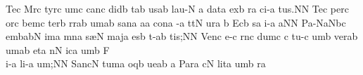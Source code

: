 \spatium
\sgn Te{}\punctum c\egn
\spatium
\sgn M{\a}r\punctum c\egn
\sgn tyr\punctum c\egn
\sgn {}um\punctum c\egn
\spatium\sgn can\punctum c\egn
\sgn did\punctum b\egn
\sgn {}{\a}t\pes ab\egn
\sgn {}us\punctum a\augmentum b\egn
\spatium
\divisiominor
\spatium
\sgn l{au}-\punctum N\egn
\custos a
\lineaproxima
\sgn dat\punctum a\egn
\spatium
\sgn {}ex\punctum b\egn
\sgn {}{\e}r\punctum a\egn
\sgn ci-\punctum a\egn
\sgn tu{s.}\punctum N\augmentum N\egn
\spatium\divisiofinalis\spatium
\sgn Te{}\punctum c\egn
\spatium\sgn per\punctum c\egn
\spatium\sgn {}or\punctum c\egn
\sgn bem\punctum c\egn
\spatium\sgn ter\punctum b\egn
\sgn r{\a}r\pes ab\egn
\sgn {}um\punctum a\augmentum b\egn
\spatium
\divisiominor
\spatium
\sgn san\punctum a\egn
{}a{}\punctum a\egn
\spatium
\sgn con\punctum a\egn
{}-\punctum a\egn
\sgn t{\e}t\punctum N\egn
\sgn {}ur\punctum a\egn
\spatium
\custos b
\lineaproxima
\sgn {}Ec\punctum b\egn
{}s\punctum a\egn
\sgn {}i-\punctum a\egn
\sgn {}a{}\punctum N\augmentum N\egn
\spatium
\divisiofinalis
\spatium
\sgn Pa{-}\pes Na\augmentum N\nonspatium\hskip-3pt\quilismapes bc\egn
{}em\clivis ba\augmentumduplex bN\egn
\spatium
\divisiominima
\spatium
\sgn {}im\punctum a\egn
\sgn m{\e}n\punctum a\egn
\sgn s{\ae}{}\punctum N\egn
\spatium
\sgn maj\punctum a\egn
\sgn {}es\punctum b\egn
\sgn t{\a}-\punctum a\augmentum b\egn
\sgn ti{s;}\punctum N\augmentum N\egn
\spatium
\divisiofinalis
\spatium
\sgn Ven\punctum c\egn
\sgn {}e-\punctum c\egn
\sgn r{\a}n\punctum c\egn
\sgn dum\punctum c\egn
\spatium
\custos c
\lineaproxima
\sgn tu-\punctum c\egn
\sgn {}um\punctum b\egn
\spatium
\sgn ver\pes ab\egn
\sgn {}um\punctum a\augmentum b\egn
\spatium
\divisiominor
\spatium
\sgn {}et\punctum a\egn
\spatium
\sgn {}{\u}n\punctum N\egn
\sgn {}ic\punctum a\egn
\sgn {}um\punctum b\egn
\spatium
\sgn F{\\i}-\punctum a\egn
\sgn li-\punctum a\egn
\sgn {}u{m;}\punctum N\augmentum N\egn
\spatium
\divisiofinalis
\spatium
\sgn Sa{nc}\punctum N\egn
\sgn tu{m}\punctum a\egn
\spatium
{}oq\punctum b\egn
\sgn ue{}\punctum a\augmentum b\egn
\spatium
\divisiominima
\spatium
\custos a
\lineaproxima
\sgn Par\punctum a\egn
\sgn {}{\a}c\punctum N\egn
\sgn lit\punctum a\egn
\sgn {}um\punctum b\egn
\spatium
%
r\punctum a\egn
